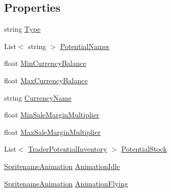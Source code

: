 \subsection*{Properties}
\begin{DoxyCompactItemize}
\item 
string \hyperlink{class_trader_prototype_a16f54dc71faed15a0466dc7ebc413926}{Type}
\item 
List$<$ string $>$ \hyperlink{class_trader_prototype_a9ae59b2fcd50f11570f4e81e2fac6427}{Potential\+Names}
\item 
float \hyperlink{class_trader_prototype_aaa627e7a39e69ba57d703f3d0056585b}{Min\+Currency\+Balance}
\item 
float \hyperlink{class_trader_prototype_a767e713c25e3a3d45219da5f1f2d5c7f}{Max\+Currency\+Balance}
\item 
string \hyperlink{class_trader_prototype_ac27d2b342481a71505f3e31d995165e9}{Currency\+Name}
\item 
float \hyperlink{class_trader_prototype_ae6adbb7df143ffe22c397817bdfc61c9}{Min\+Sale\+Margin\+Multiplier}
\item 
float \hyperlink{class_trader_prototype_ad3bbb1b8cb38db246dad80ddd9f21c1a}{Max\+Sale\+Margin\+Multiplier}
\item 
List$<$ \hyperlink{class_trader_potential_inventory}{Trader\+Potential\+Inventory} $>$ \hyperlink{class_trader_prototype_a7c5d5d814feb2f88ec9734d04520f353}{Potential\+Stock}
\item 
\hyperlink{class_animation_1_1_spritename_animation}{Spritename\+Animation} \hyperlink{class_trader_prototype_ab93ef3072e1273b6aecacff9c5afa9c5}{Animation\+Idle}
\item 
\hyperlink{class_animation_1_1_spritename_animation}{Spritename\+Animation} \hyperlink{class_trader_prototype_a2a412bcfc58980d6c862bf4d46bf8fa9}{Animation\+Flying}

\end{DoxyCompactItemize}
